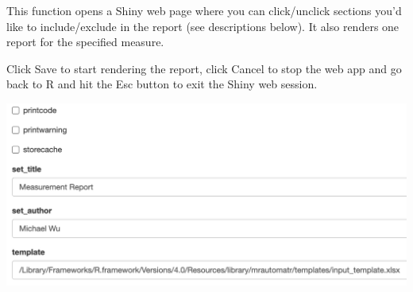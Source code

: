 \documentclass[
]{book}
\begin{document}
This function opens a Shiny web page where you can click/unclick sections you'd like to include/exclude in the report (see descriptions below). It also renders one report for the specified measure.

Click Save to start rendering the report, click Cancel to stop the web app and go back to R and hit the Esc button to exit the Shiny web session.

\begin{center}\includegraphics[width=0.66\linewidth]{images/render_report_manual1} \end{center}
\end{document}
